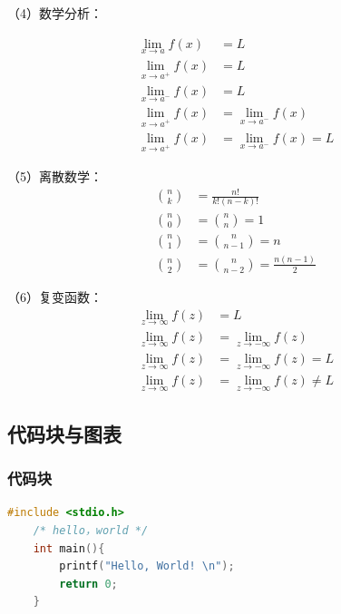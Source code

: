 \documentclass[UTF8, zihao = -4, linespread = 1.335, heading = true, fontset = none]{ctexart}
\begin{document}
（4）数学分析：

\begin{equation}
    \begin{split}
        \lim_{x \to a}f(x) &= L \\
        \lim_{x \to a^+}f(x) &= L \\
        \lim_{x \to a^-}f(x) &= L \\
        \lim_{x \to a^+}f(x) &= \lim_{x \to a^-}f(x) \\
        \lim_{x \to a^+}f(x) &= \lim_{x \to a^-}f(x) = L
    \end{split}
\end{equation}

（5）离散数学：
\begin{equation}
    \begin{split}
        \binom{n}{k} &= \frac{n!}{k!(n-k)!} \\
        \binom{n}{0} &= \binom{n}{n} = 1 \\
        \binom{n}{1} &= \binom{n}{n-1} = n \\
        \binom{n}{2} &= \binom{n}{n-2} = \frac{n(n-1)}{2}
    \end{split}
\end{equation}

（6）复变函数：
\begin{equation}
    \begin{split}
        \lim_{z \to \infty}f(z) &= L \\
        \lim_{z \to \infty}f(z) &= \lim_{z \to -\infty}f(z) \\
        \lim_{z \to \infty}f(z) &= \lim_{z \to -\infty}f(z) = L \\
        \lim_{z \to \infty}f(z) &= \lim_{z \to -\infty}f(z) \neq L
    \end{split}
\end{equation}
\subsection{代码块与图表}
\subsubsection{代码块}
\begin{lstlisting}[language=C]
    #include <stdio.h>
    /* hello，world */
    int main(){
        printf("Hello, World! \n"); 
        return 0;
    }
\end{lstlisting}
\end{document}

